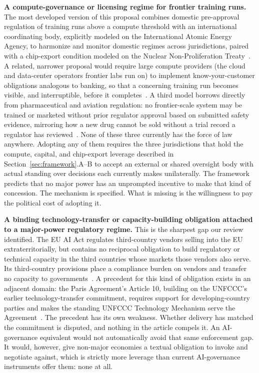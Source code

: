 \documentclass[journal]{IEEEtran}
\begin{document}
\textbf{A compute-governance or licensing regime for frontier training runs.} The most developed version of this proposal combines domestic pre-approval regulation of training runs above a compute threshold with an international coordinating body, explicitly modeled on the International Atomic Energy Agency, to harmonize and monitor domestic regimes across jurisdictions, paired with a chip-export condition modeled on the Nuclear Non-Proliferation Treaty~\cite{belfield2025institutions}. A related, narrower proposal would require large compute providers (the cloud and data-center operators frontier labs run on) to implement know-your-customer obligations analogous to banking, so that a concerning training run becomes visible, and interruptible, before it completes~\cite{egan2023kyc}. A third model borrows directly from pharmaceutical and aviation regulation: no frontier-scale system may be trained or marketed without prior regulator approval based on submitted safety evidence, mirroring how a new drug cannot be sold without a trial record a regulator has reviewed~\cite{salvador2024certified}. None of these three currently has the force of law anywhere. Adopting any of them requires the three jurisdictions that hold the compute, capital, and chip-export leverage described in Section~\ref{sec:framework}.A--B to accept an external or shared oversight body with actual standing over decisions each currently makes unilaterally. The framework predicts that no major power has an unprompted incentive to make that kind of concession. The mechanism is specified. What is missing is the willingness to pay the political cost of adopting it.

\textbf{A binding technology-transfer or capacity-building obligation attached to a major-power regulatory regime.} This is the sharpest gap our review identified. The EU AI Act regulates third-country vendors selling into the EU extraterritorially, but contains no reciprocal obligation to build regulatory or technical capacity in the third countries whose markets those vendors also serve. Its third-country provisions place a compliance burden on vendors and transfer no capacity to governments~\cite{euaiact2024}. A precedent for this kind of obligation exists in an adjacent domain: the Paris Agreement's Article 10, building on the UNFCCC's earlier technology-transfer commitment, requires support for developing-country parties and makes the standing UNFCCC Technology Mechanism serve the Agreement~\cite{unfccc2015parisart10}. The precedent has its own weakness. Whether delivery has matched the commitment is disputed, and nothing in the article compels it. An AI-governance equivalent would not automatically avoid that same enforcement gap. It would, however, give non-major economies a textual obligation to invoke and negotiate against, which is strictly more leverage than current AI-governance instruments offer them: none at all.
\end{document}
